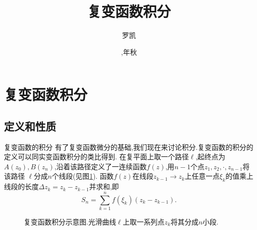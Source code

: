 \documentclass[fontset=windows, chinese, 10pt]{beamer}
\title{复变函数积分}
\date{\zhdigits{\the\year},\zhganzhinian{\the\year}年秋}
\author{罗凯}
\institute{南京理工大学物理学院}
\begin{document}

  

  
  
  
  \begin{frame}
  \titlepage
  \end{frame}
  
  

  \section{复变函数积分}
  \subsection{定义和性质}
\label{sec:preknowledge}

\begin{frame}{复变函数的积分}
  \small
有了复变函数微分的基础,我们现在来讨论积分.复变函数的积分的定义可以同实变函数积分的类比得到.
在复平面上取一个路径$\ell$,起终点为$A(z_0),B(z_n)$,沿着该路径定义了一连续函数$f(z)$,用$n-1$个点$z_1, z_2,\cdot, z_{n-1}$将该路径
$\ell$分成$n$个线段(见图\ref{fig:complex_integral}).
函数$f(z)$在线段$z_{k-1}\rightarrow z_{k}$上任意一点$\xi_k$的值乘上线段的长度$\Delta z_k = z_k - z_{k-1}$并求和,即
\begin{equation}
    S_n = \sum_{k=1}^{n} f(\xi_k) (z_{k} - z_{k-1}) .
\end{equation}
\begin{figure}[htbp]
    \centering
    \scalebox{0.6}{
    
    }
    \caption{复变函数积分示意图.光滑曲线$\ell$上取一系列点$z_k$将其分成$n$小段.}
    \label{fig:complex_integral}
\end{figure}
\end{frame}
\end{document}
